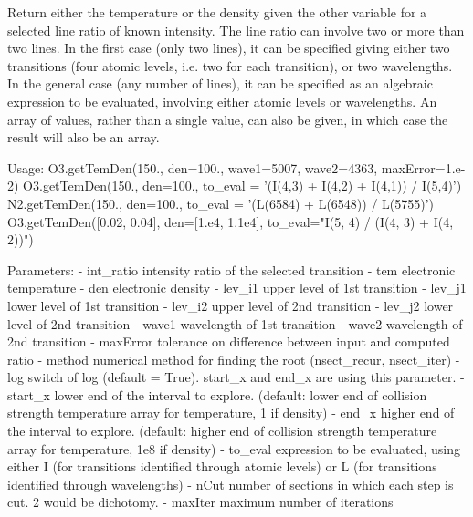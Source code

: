 \begin{DoxyVerb}Return either the temperature or the density given the other variable for a selected line ratio 
    of known intensity.
The line ratio can involve two or more than two lines. 
In the first case (only two lines), it can be specified giving either two transitions 
    (four atomic levels, i.e. two for each transition), or two wavelengths.
In the general case (any number of lines), it can be specified as an algebraic expression 
    to be evaluated, involving either atomic levels or wavelengths.
An array of values, rather than a single value, can also be given, in which case the result 
    will also be an array.
    
Usage: 
    O3.getTemDen(150., den=100., wave1=5007, wave2=4363, maxError=1.e-2)
    O3.getTemDen(150., den=100., to_eval = '(I(4,3) + I(4,2) + I(4,1)) / I(5,4)')
    N2.getTemDen(150., den=100., to_eval = '(L(6584) + L(6548)) / L(5755)')
    O3.getTemDen([0.02, 0.04], den=[1.e4, 1.1e4], to_eval="I(5, 4) / (I(4, 3) + I(4, 2))")

Parameters:
    - int_ratio    intensity ratio of the selected transition
    - tem          electronic temperature
    - den          electronic density
    - lev_i1       upper level of 1st transition
    - lev_j1       lower level of 1st transition
    - lev_i2       upper level of 2nd transition
    - lev_j2       lower level of 2nd transition
    - wave1        wavelength of 1st transition
    - wave2        wavelength of 2nd transition
    - maxError     tolerance on difference between input and computed ratio 
    - method       numerical method for finding the root (nsect_recur, nsect_iter)
    - log          switch of log (default = True). start_x and end_x are using this parameter.
    - start_x      lower end of the interval to explore. (default: lower end of collision 
            strength temperature array for temperature, 1 if density)
    - end_x        higher end of the interval to explore. (default: higher end of collision 
            strength temperature array for temperature, 1e8 if density)
    - to_eval      expression to be evaluated, using either I (for transitions identified 
            through atomic levels) or L (for transitions identified through wavelengths)
    - nCut        number of sections in which each step is cut. 2 would be dichotomy.
    - maxIter     maximum number of iterations\end{DoxyVerb}
 \hypertarget{classpyneb_1_1core_1_1pynebcore_1_1_atom_acf586a33a19e340d5da3ddd7fcf84f9c}{}
